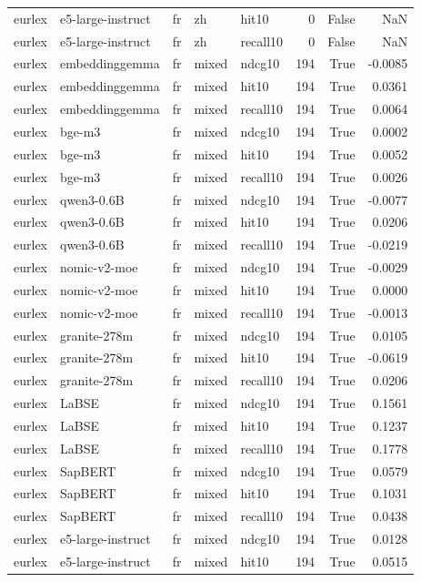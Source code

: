 \begin{tabular}{lllllrrr}
eurlex & e5-large-instruct & fr & zh & hit10 & 0 & False & NaN \\
eurlex & e5-large-instruct & fr & zh & recall10 & 0 & False & NaN \\
eurlex & embeddinggemma & fr & mixed & ndcg10 & 194 & True & -0.0085 \\
eurlex & embeddinggemma & fr & mixed & hit10 & 194 & True & 0.0361 \\
eurlex & embeddinggemma & fr & mixed & recall10 & 194 & True & 0.0064 \\
eurlex & bge-m3 & fr & mixed & ndcg10 & 194 & True & 0.0002 \\
eurlex & bge-m3 & fr & mixed & hit10 & 194 & True & 0.0052 \\
eurlex & bge-m3 & fr & mixed & recall10 & 194 & True & 0.0026 \\
eurlex & qwen3-0.6B & fr & mixed & ndcg10 & 194 & True & -0.0077 \\
eurlex & qwen3-0.6B & fr & mixed & hit10 & 194 & True & 0.0206 \\
eurlex & qwen3-0.6B & fr & mixed & recall10 & 194 & True & -0.0219 \\
eurlex & nomic-v2-moe & fr & mixed & ndcg10 & 194 & True & -0.0029 \\
eurlex & nomic-v2-moe & fr & mixed & hit10 & 194 & True & 0.0000 \\
eurlex & nomic-v2-moe & fr & mixed & recall10 & 194 & True & -0.0013 \\
eurlex & granite-278m & fr & mixed & ndcg10 & 194 & True & 0.0105 \\
eurlex & granite-278m & fr & mixed & hit10 & 194 & True & -0.0619 \\
eurlex & granite-278m & fr & mixed & recall10 & 194 & True & 0.0206 \\
eurlex & LaBSE & fr & mixed & ndcg10 & 194 & True & 0.1561 \\
eurlex & LaBSE & fr & mixed & hit10 & 194 & True & 0.1237 \\
eurlex & LaBSE & fr & mixed & recall10 & 194 & True & 0.1778 \\
eurlex & SapBERT & fr & mixed & ndcg10 & 194 & True & 0.0579 \\
eurlex & SapBERT & fr & mixed & hit10 & 194 & True & 0.1031 \\
eurlex & SapBERT & fr & mixed & recall10 & 194 & True & 0.0438 \\
eurlex & e5-large-instruct & fr & mixed & ndcg10 & 194 & True & 0.0128 \\
eurlex & e5-large-instruct & fr & mixed & hit10 & 194 & True & 0.0515 \\

\end{tabular}

